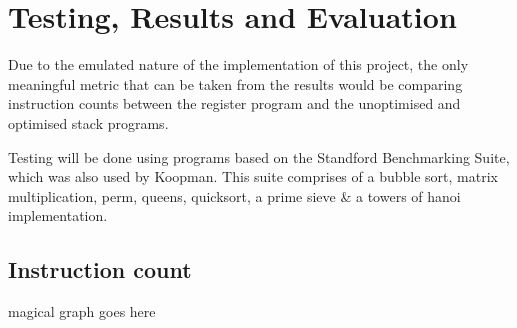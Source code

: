 \chapter{Testing, Results and Evaluation}\label{ch:testingresults}

Due to the emulated nature of the implementation of this project, the only
meaningful metric that can be taken from the results would be comparing
instruction counts between the register program and the unoptimised and
optimised stack programs.

Testing will be done using programs based on the Standford Benchmarking Suite,
which was also used by Koopman. This suite comprises of a bubble sort, matrix
multiplication, perm, queens, quicksort, a prime sieve \& a towers of hanoi
implementation.

\section{Instruction count}

magical graph goes here

